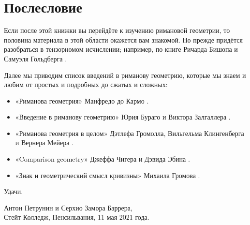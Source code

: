 \chapter{Послесловие}

Если после этой книжки вы перейдёте к изучению римановой геометрии, то половина материала в этой области окажется вам знакомой.
Но прежде придётся разобраться в тензорномом исчислении; например, по книге Ричарда Бишопа и Самуэля Гольдберга \cite{bishop-goldberg}.

Далее мы приводим список введений в риманову геометрию, которые мы знаем и любим
от простых и подробных до сжатых и сложных:
\begin{itemize}
\item «Риманова геометрия»  Манфредо до Кармо \cite{carmo1992riemannian}.
\item «Введение в риманову геометрию» Юрия Бураго и Виктора Залгаллера \cite{burago-zalgaller}.
\item «Риманова геометрия в целом»  Дэтлефа Громолла, Вильгельма Клингенберга и Вернера Мейера \cite{gromoll-klingenberg-meyer,gromoll-klingenberg-meyer-ru}.
\item «Comparison geometry»  Джеффа Чигера и Дэвида Эбина \cite{cheeger-ebin}.
\item «Знак и геометрический смысл кривизны» Михаила Громова \cite{gromov-1991}.
\end{itemize}
Удачи.

\begin{flushright}
Антон Петрунин и Серхио Замора Баррера,\\
Стейт-Колледж, Пенсильвания, 11 мая 2021 года.
\end{flushright}

